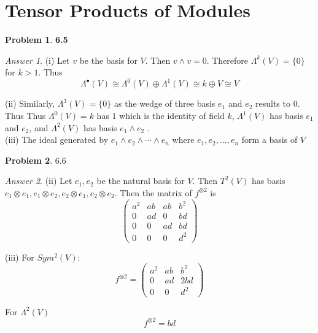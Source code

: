 \documentclass[10pt,a4paper]{article}
\theoremstyle{plain}
\theoremstyle{definition}
\newtheorem*{problem*}{Problem}
\theoremstyle{remark}
\newtheorem*{answer*}{Answer}
\newcommand{\<}{\langle}
\renewcommand{\>}{\rangle}
\newcommand{\isom}{\cong}
\begin{document}
\section{Tensor Products of Modules}
\label{sec:Tensor Products of Modules}

\begin{problem*} \bfseries 6.5
\end{problem*}

\begin{answer*} \hfill

(i) Let $v$ be the basis for $V$. Then $v\wedge v = 0$. Therefore $\Lambda^k(V) = \{0\}$ for $k>1$. Thus
\[\Lambda^\bullet(V) \isom \Lambda^0(V)\oplus \Lambda^1(V) \isom k \oplus V \isom V \]

(ii) Similarly, $\Lambda^3(V) = \{0\}$ as the wedge of three basis $e_1$ and $e_2$ results to 0. Thus Thus $\Lambda^0(V) = k$ has $1$ which is the identity of field $k$, $\Lambda^1(V)$ has basis $e_1$ and $e_2$, and $\Lambda^2(V)$ has basis $e_1\wedge e_2$ . \\

(iii) The ideal generated by $e_1\wedge e_2\wedge\cdots\wedge e_n$ where $e_1,e_2,...,e_n$ form a basis of $V$
\end{answer*}



\begin{problem*} 6.6
\end{problem*}

\begin{answer*} \hfill

(ii) Let $e_1, e_2$ be the natural basis for $V$. Then $T^2(V)$ has basis $e_1\otimes e_1,e_1\otimes e_2, e_2\otimes e_1, e_2\otimes e_2$. Then the matrix of $f^{\otimes 2}$ is
\[\begin{pmatrix} a^2 & ab & ab & b^2\\ 0 &  ad & 0 & bd \\ 0 & 0 & ad & bd \\0 & 0 & 0 & d^2
 \end{pmatrix}\]

(iii) For $Sym^2(V)$:
\[f^{\otimes 2} = \begin{pmatrix} a^2 & ab & b^2 \\ 0 & ad & 2bd \\ 0 & 0 & d^2
 \end{pmatrix}\]

For $\Lambda^2(V)$
\[f^{\otimes 2} = bd\]

\end{answer*}
\end{document}
